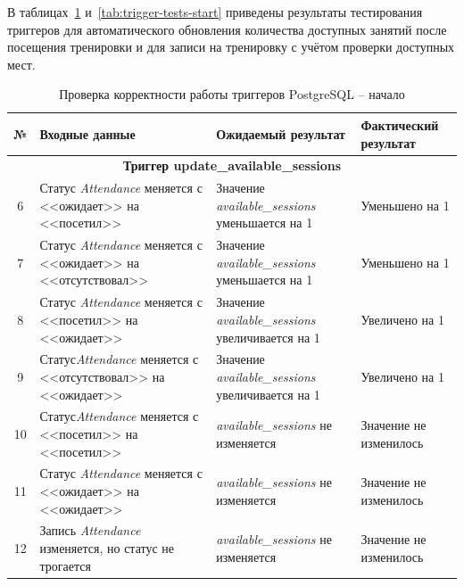 В таблицах~\ref{tab:trigger-tests-end} и~\ref{tab:trigger-tests-start} приведены результаты тестирования триггеров для автоматического обновления количества доступных занятий после посещения тренировки и для записи на тренировку с учётом проверки доступных мест.

\begin{table}[H]
	\centering
	\caption{Проверка корректности работы триггеров PostgreSQL -- начало}
	\label{tab:trigger-tests-end}
	\begin{tabular}{|c|p{5.5cm}|p{5cm}|p{4cm}|}
		\hline
		\textbf{№} & \textbf{Входные данные} & \textbf{Ожидаемый \newline результат} & \textbf{Фактический результат} \\
		\hline
		
		\multicolumn{4}{|c|}{\textbf{Триггер update\_available\_sessions}} \\
		\hline
		
		6 & Статус \textit{Attendance} меняется с <<ожидает>> на <<посетил>> & Значение \textit{available\_sessions} уменьшается на 1 & Уменьшено на 1 \\
		\hline
		
		7 & Статус \textit{Attendance} меняется с <<ожидает>> на <<отсутствовал>> & Значение \textit{available\_sessions} уменьшается на 1 & Уменьшено на 1 \\
		\hline
		
		8 & Статус  \textit{Attendance} меняется с <<посетил>> на <<ожидает>> & Значение \textit{available\_sessions} увеличивается на 1 & Увеличено на 1 \\
		\hline
		
		9 & Статус\textit{Attendance}  меняется с <<отсутствовал>> на <<ожидает>> & Значение \textit{available\_sessions} увеличивается на 1 & Увеличено на 1 \\
		\hline
		
		10 & Статус\textit{Attendance}  меняется с <<посетил>> на <<посетил>> & \textit{available\_sessions} не изменяется & Значение не изменилось \\
		\hline
		
		11 & Статус \textit{Attendance} меняется с <<ожидает>> на <<ожидает>> & \textit{available\_sessions} не изменяется & Значение не изменилось \\
		\hline
		
		12 & Запись \textit{Attendance} изменяется, но статус не трогается & \textit{available\_sessions} не изменяется & Значение не изменилось \\
		\hline
	\end{tabular}
\end{table}


